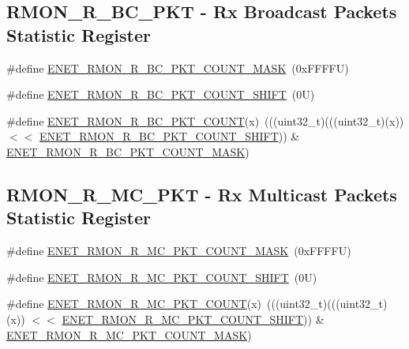 \subsection*{R\+M\+O\+N\+\_\+\+R\+\_\+\+B\+C\+\_\+\+P\+KT -\/ Rx Broadcast Packets Statistic Register}
\begin{DoxyCompactItemize}
\item 
\#define \mbox{\hyperlink{group___e_n_e_t___register___masks_gaea4e90fb7dfef377bdfbd1ec0591c1a9}{E\+N\+E\+T\+\_\+\+R\+M\+O\+N\+\_\+\+R\+\_\+\+B\+C\+\_\+\+P\+K\+T\+\_\+\+C\+O\+U\+N\+T\+\_\+\+M\+A\+SK}}~(0x\+F\+F\+F\+F\+U)
\item 
\#define \mbox{\hyperlink{group___e_n_e_t___register___masks_gaaadc28d495f1451106da4fcb1e2833ea}{E\+N\+E\+T\+\_\+\+R\+M\+O\+N\+\_\+\+R\+\_\+\+B\+C\+\_\+\+P\+K\+T\+\_\+\+C\+O\+U\+N\+T\+\_\+\+S\+H\+I\+FT}}~(0\+U)
\item 
\#define \mbox{\hyperlink{group___e_n_e_t___register___masks_gad997cfc2457658dabbd489f83129f403}{E\+N\+E\+T\+\_\+\+R\+M\+O\+N\+\_\+\+R\+\_\+\+B\+C\+\_\+\+P\+K\+T\+\_\+\+C\+O\+U\+NT}}(x)~(((uint32\+\_\+t)(((uint32\+\_\+t)(x)) $<$$<$ \mbox{\hyperlink{group___e_n_e_t___register___masks_gaaadc28d495f1451106da4fcb1e2833ea}{E\+N\+E\+T\+\_\+\+R\+M\+O\+N\+\_\+\+R\+\_\+\+B\+C\+\_\+\+P\+K\+T\+\_\+\+C\+O\+U\+N\+T\+\_\+\+S\+H\+I\+FT}})) \& \mbox{\hyperlink{group___e_n_e_t___register___masks_gaea4e90fb7dfef377bdfbd1ec0591c1a9}{E\+N\+E\+T\+\_\+\+R\+M\+O\+N\+\_\+\+R\+\_\+\+B\+C\+\_\+\+P\+K\+T\+\_\+\+C\+O\+U\+N\+T\+\_\+\+M\+A\+SK}})
\end{DoxyCompactItemize}
\subsection*{R\+M\+O\+N\+\_\+\+R\+\_\+\+M\+C\+\_\+\+P\+KT -\/ Rx Multicast Packets Statistic Register}
\begin{DoxyCompactItemize}
\item 
\#define \mbox{\hyperlink{group___e_n_e_t___register___masks_gaffc93969b103038343e11847c1dd49f0}{E\+N\+E\+T\+\_\+\+R\+M\+O\+N\+\_\+\+R\+\_\+\+M\+C\+\_\+\+P\+K\+T\+\_\+\+C\+O\+U\+N\+T\+\_\+\+M\+A\+SK}}~(0x\+F\+F\+F\+F\+U)
\item 
\#define \mbox{\hyperlink{group___e_n_e_t___register___masks_ga2bd574ecd5d63b6c391f9db9c33a22f6}{E\+N\+E\+T\+\_\+\+R\+M\+O\+N\+\_\+\+R\+\_\+\+M\+C\+\_\+\+P\+K\+T\+\_\+\+C\+O\+U\+N\+T\+\_\+\+S\+H\+I\+FT}}~(0\+U)
\item 
\#define \mbox{\hyperlink{group___e_n_e_t___register___masks_ga8407d8b93947fd3cb51d75cbc605c48d}{E\+N\+E\+T\+\_\+\+R\+M\+O\+N\+\_\+\+R\+\_\+\+M\+C\+\_\+\+P\+K\+T\+\_\+\+C\+O\+U\+NT}}(x)~(((uint32\+\_\+t)(((uint32\+\_\+t)(x)) $<$$<$ \mbox{\hyperlink{group___e_n_e_t___register___masks_ga2bd574ecd5d63b6c391f9db9c33a22f6}{E\+N\+E\+T\+\_\+\+R\+M\+O\+N\+\_\+\+R\+\_\+\+M\+C\+\_\+\+P\+K\+T\+\_\+\+C\+O\+U\+N\+T\+\_\+\+S\+H\+I\+FT}})) \& \mbox{\hyperlink{group___e_n_e_t___register___masks_gaffc93969b103038343e11847c1dd49f0}{E\+N\+E\+T\+\_\+\+R\+M\+O\+N\+\_\+\+R\+\_\+\+M\+C\+\_\+\+P\+K\+T\+\_\+\+C\+O\+U\+N\+T\+\_\+\+M\+A\+SK}})
\end{DoxyCompactItemize}
